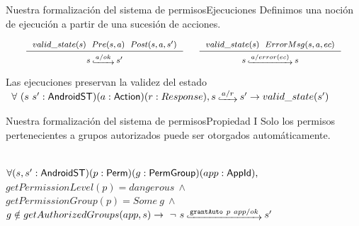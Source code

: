 \documentclass[pdf, handout]{beamer} %
\begin{document}
\begin{frame}{Nuestra formalización del sistema de permisos}{Ejecuciones}
    Definimos una noción de ejecución a partir de una sucesión de acciones.

    \begin{displaymath}
        \fontsize{8pt}{9pt}\selectfont
        \begin{array}{c}
            \inference[]{$$valid\_state(s)$$ \hspace{.2cm} $$Pre(s, a)$$ \hspace{.2cm} $$Post(s, a, s')$$}{$$s\step{a/ok}s'$$}
            \hspace{0.5cm}
            \inference[]{$$valid\_state(s)$$ \hspace{.2cm} $$ErrorMsg(s, a, ec)$$}{$$s\step{a/error(ec)}s$$}
        \end{array}
    \end{displaymath}
    \pause
    \begin{theorem}{Las ejecuciones preservan la validez del estado}
        \fontsize{9pt}{12pt}\selectfont
        $\begin{array}{l} \forall\ (s\ s':\AndroidState)(a:\Action) (r:Response), s\step{a/r}s'
                \rightarrow valid\_state(s')\end{array}$
    \end{theorem}
\end{frame}

\begin{frame}{Nuestra formalización del sistema de permisos}{Propiedad I}
    Solo los permisos pertenecientes a grupos autorizados puede ser otorgados automáticamente.
    \pause \vspace{20px}
    \begin{prop} \mbox{} \\
        \fontsize{9pt}{15pt}\selectfont
        $\forall (s,s': \mathsf{AndroidST}) (p:\mathsf{Perm}) (g:\mathsf{PermGroup}) (app:\mathsf{AppId}),$ \\
        $getPermissionLevel(p) = dangerous\ \land$ \\
        $getPermissionGroup(p) = Some\ g\ \land$ \\
        $g \notin getAuthorizedGroups(app,s) \rightarrow\ \neg\ \Mathexecrel{s}{\texttt{grantAuto}~p~app/ok}{s'}$ \\
    \end{prop}
\end{frame}
\end{document}
